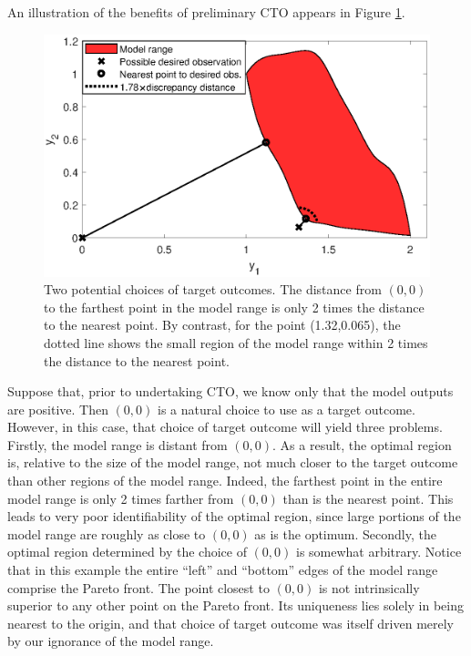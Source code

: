 \documentclass[12pt]{article}
\begin{document}
An illustration of the benefits of preliminary CTO appears in Figure \ref{fig:do_selection_example}.
%
\begin{figure}
\centering
\includegraphics[scale=.8]{FIG_des_obs_selection_example.eps}
\caption{Two potential choices of target outcomes. 
%
The distance from $(0,0)$ to the farthest point in the model range is only 2 times the distance to the nearest point. 
%
By contrast, for the point (1.32,0.065), the dotted line shows the small region of the model range within 2 times the distance to the nearest point.}
\label{fig:do_selection_example}
\end{figure}
%
Suppose that, prior to undertaking CTO, we know only that the model outputs are positive.
%
Then $(0,0)$ is a natural choice to use as a target outcome.
%
However, in this case, that choice of target outcome will yield three problems.
%
Firstly, the model range is distant from $(0,0)$.
%
As a result, the optimal region is, relative to the size of the model range, not much closer to the target outcome than other regions of the model range.
%
Indeed, the farthest point in the entire model range is only 2 times farther from $(0,0)$ than is the nearest point.
%
This leads to very poor identifiability of the optimal region, since large portions of the model range are roughly as close to $(0,0)$ as is the optimum.
%
Secondly, the optimal region determined by the choice of $(0,0)$ is somewhat arbitrary.
%
Notice that in this example the entire ``left'' and ``bottom''  edges of the model range comprise the Pareto front.
%
The point closest to $(0,0)$ is not intrinsically superior to any other point on the Pareto front.
%
Its uniqueness lies solely in being nearest to the origin, and that choice of target outcome was itself driven merely by our ignorance of the model range.
\end{document}
